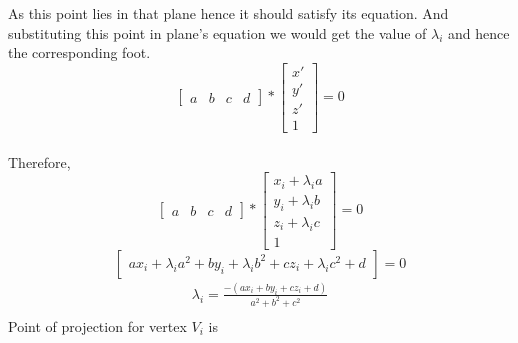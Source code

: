 As this point lies in that plane hence it should satisfy its equation. And substituting this point in plane's equation we would get the value of  $\lambda_i$ and hence the corresponding foot.\[ \begin{bmatrix}
         a &  b & c & d
         \end{bmatrix} * \begin{bmatrix}
         x\prime   \\
         y\prime    \\
         z\prime    \\
         1
         \end{bmatrix} = 0\]\\
       Therefore, \\
      \[ \begin{bmatrix}
         a &  b & c & d
         \end{bmatrix} * \begin{bmatrix}
         x_i+\lambda_{i} a  \\
         y_i+\lambda_{i} b   \\
         z_i+\lambda_{i} c  \\
         1
         \end{bmatrix} = 0\]
      \[ \begin{bmatrix}
         ax_i+\lambda_{i}a^{2} + by_i+\lambda_{i}b^{2} + cz_i+\lambda_{i}c^{2}+d
         \end{bmatrix} = 0 \]
  \begin{gather}   
  \lambda_{i} = \frac{-(ax_i+by_i+cz_i+d)}{a^{2}+b^{2}+c^{2}} \\
   \end{gather}
Point of projection for vertex $V_i$ is
 
